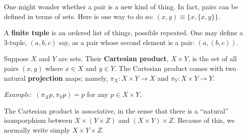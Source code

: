 \documentclass[10pt, a4paper, twocolumn]{article}
\newcommand{\defn}[1]{\textbf{#1}}
\newcommand{\eg}{\emph{Example:}\relax}
\begin{document}
One might wonder whether a pair is a new kind of thing. In fact, pairs can be
defined in terms of sets. Here is one way to do so: $(x, y)\equiv \{x, \{x,y\}\}$.

A \defn{finite tuple} is an ordered list of things, possible repeated. One may
define a 3-tuple, $(a, b, c)$ say, as a pair whose second element is a pair:
$(a, (b, c))$. 

Suppose $X$ and $Y$ are sets. Their \defn{Cartesian product}, $X \times Y$, is the
set of all pairs $(x, y)$ where $x \in X$ and $y \in Y$. The Cartesian product comes
with two natural \defn{projection} maps; namely, $\pi_X : X \times Y \to X$ and $\pi_Y : X
\times Y \to Y$.

\eg\ $(\pi_X p, \pi_Y p) = p$ for any $p \in X \times Y$.

The Cartesian product is associative, in the sense that there is a
``natural'' isomporphism between $X \times (Y \times Z)$ and $(X
\times Y) \times Z$. Because of this, we normally write simply $X
\times Y \times Z$.
\end{document}
